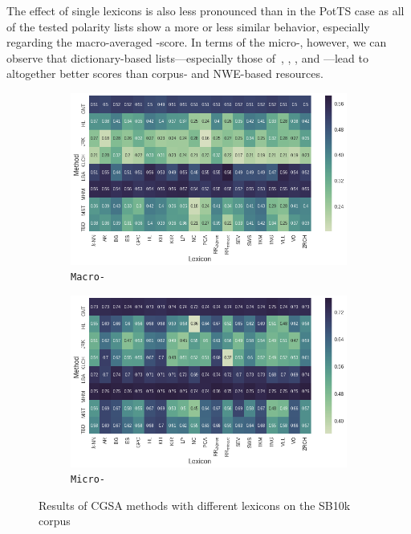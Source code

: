 The effect of single lexicons is also less pronounced than in the
PotTS case as all of the tested polarity lists show a more or less
similar behavior, especially regarding the macro-averaged \F{}-score.
In terms of the micro-\F{}, however, we can observe that
dictionary-based lists---especially those of~\citet{Awadallah:10},
\citet{Blair-Goldensohn:08}, \citet{Hu:04}, and \citet{Kim:04}---lead
to altogether better scores than corpus- and NWE-based resources.

\begin{figure}
{
\centering
\begin{subfigure}{.5\textwidth}
  \centering
  \includegraphics[width=\linewidth]{img/cgsa_sb10k_macro_lexicons.png}
  \caption{\texttt{Macro-\F}}\label{cgsa:fig:sb10k-lexicon-macro}
\end{subfigure}%
\begin{subfigure}{.5\textwidth}
  \centering
  \includegraphics[width=\linewidth]{img/cgsa_sb10k_micro_lexicons.png}
  \caption{\texttt{Micro-\F}}\label{cgsa:fig:sb10k-lexicon-micro}
\end{subfigure}
}
\caption[SB10k Results with different lexicons]{Results of CGSA
  methods with different lexicons on the SB10k
  corpus}\label{cgsa:fig:sb10k-lexicon-effect}
\end{figure}


